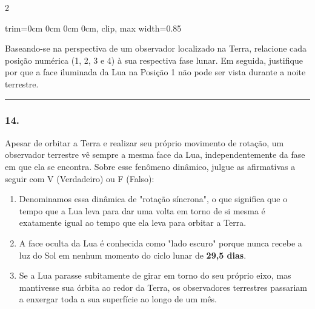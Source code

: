 \documentclass[twoside, 10pt, a4paper]{article}
\newlength{\espacoPreQuestao}\setlength{\espacoPreQuestao}{0.1cm}
\newlength{\espacoQuestao}\setlength{\espacoQuestao}{0.2cm}
\newlength{\espacoAlt}\setlength{\espacoAlt}{0.2cm}
\newcommand{\larguraTikz}{0.85\linewidth}
\begin{document}
\begin{multicols*}{2}
\begin{center}
\begin{adjustbox}{trim=0cm 0cm 0cm 0cm, clip, max width=\larguraTikz}
\end{adjustbox}
\end{center}

Baseando-se na perspectiva de um observador localizado na Terra, relacione cada posição numérica (1, 2, 3 e 4) à sua respectiva fase lunar. Em seguida, justifique por que a face iluminada da Lua na Posição 1 não pode ser vista durante a noite terrestre.
\par\vspace{\espacoQuestao}

\noindent\textcolor{CorLinha}{\rule{\linewidth}{0.5pt}} 
\par\vspace{\espacoPreQuestao}
\subsubsection*{14.} Apesar de orbitar a Terra e realizar seu próprio movimento de rotação, um observador terrestre vê sempre a mesma face da Lua, independentemente da fase em que ela se encontra. Sobre esse fenômeno dinâmico, julgue as afirmativas a seguir com V (Verdadeiro) ou F (Falso):
\begin{enumerate}[label=\Roman*., itemsep=\espacoAlt]
    \item Denominamos essa dinâmica de "rotação síncrona", o que significa que o tempo que a Lua leva para dar uma volta em torno de si mesma é exatamente igual ao tempo que ela leva para orbitar a Terra.
    \item A face oculta da Lua é conhecida como "lado escuro" porque nunca recebe a luz do Sol em nenhum momento do ciclo lunar de \textbf{29,5 dias}.
    \item Se a Lua parasse subitamente de girar em torno do seu próprio eixo, mas mantivesse sua órbita ao redor da Terra, os observadores terrestres passariam a enxergar toda a sua superfície ao longo de um mês.
\end{enumerate}
\par\vspace{\espacoQuestao}


\end{multicols*}
\end{document}
